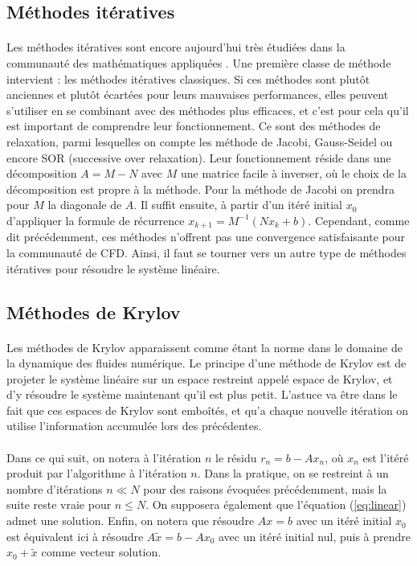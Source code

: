 	\subsection{Méthodes itératives}

		\paragraph{}
		Les méthodes itératives sont encore aujourd'hui très étudiées dans la communauté des mathématiques appliquées \cite{OlshanskiiTyrtyshnikov2014, Saad2003, TrefethenBau1997}.
		Une première classe de méthode intervient : les méthodes itératives classiques.
		Si ces méthodes sont plutôt anciennes et plutôt écartées pour leurs mauvaises performances, elles peuvent s'utiliser en se combinant avec des méthodes plus efficaces, et c'est pour cela qu'il est important de comprendre leur fonctionnement.
		Ce sont des méthodes de relaxation, parmi lesquelles on compte les méthode de Jacobi, Gauss-Seidel ou encore SOR (successive over relaxation).
		Leur fonctionnement réside dans une décomposition $A = M - N$ avec $M$ une matrice facile à inverser, où le choix de la décomposition est propre à la méthode.
		Pour la méthode de Jacobi on prendra pour $M$ la diagonale de $A$.
		Il suffit ensuite, à partir d'un itéré initial $x_0$ d'appliquer la formule de récurrence $x_{k+1} = M^{-1}\left(Nx_k + b\right)$.
		Cependant, comme dit précédemment, ces méthodes n'offrent pas une convergence satisfaisante pour la communauté de CFD.
		Ainsi, il faut se tourner vers un autre type de méthodes itératives pour résoudre le système linéaire.


	\subsection{Méthodes de Krylov}

		\paragraph{}
		Les méthodes de Krylov apparaissent comme étant la norme dans le domaine de la dynamique des fluides numérique.
		Le principe d'une méthode de Krylov est de projeter le système linéaire sur un espace restreint appelé espace de Krylov, et d'y résoudre le système maintenant qu'il est plus petit.
		L'astuce va être dans le fait que ces espaces de Krylov sont emboîtés, et qu'a chaque nouvelle itération on utilise l'information accumulée lors des précédentes.

		\paragraph{}
		Dans ce qui suit, on notera à l'itération $n$ le résidu $r_n = b - Ax_n$, où $x_n$ est l'itéré produit par l'algorithme à l'itération $n$.
		Dans la pratique, on se restreint à un nombre d'itérations $n\ll N$ pour des raisons évoquées précédemment, mais la suite reste vraie pour $n\le N$.
		On supposera également que l'équation (\ref{eq:linear}) admet une solution.
		Enfin, on notera que résoudre $Ax = b$ avec un itéré initial $x_0$ est équivalent ici à résoudre $A\tilde{x} = b - Ax_0$ avec un itéré initial nul, puis à prendre $x_0 + \tilde{x}$ comme vecteur solution.

